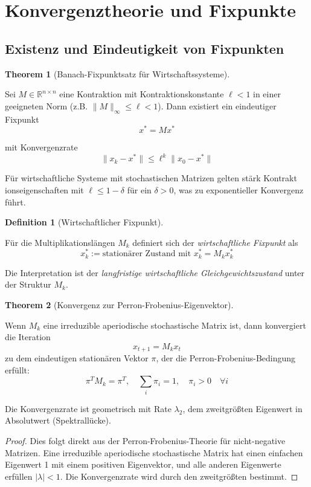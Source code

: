 \documentclass[a4paper,12pt]{article}
\theoremstyle{definition}
\newtheorem{definition}{Definition}
\newtheorem{theorem}{Theorem}
\begin{document}
\section{Konvergenztheorie und Fixpunkte}

\subsection{Existenz und Eindeutigkeit von Fixpunkten}

\begin{theorem}[Banach-Fixpunktsatz für Wirtschaftssysteme]
\label{thm:banach_wirtschaft}

Sei $M \in \mathbb{R}^{n \times n}$ eine Kontraktion mit Kontraktionskonstante $\ell < 1$ in einer geeigneten Norm (z.B. $\|M\|_\infty \leq \ell < 1$). Dann existiert ein eindeutiger Fixpunkt
\[
x^* = M x^*
\]

mit Konvergenzrate
\[
\|x_k - x^*\| \leq \ell^k \|x_0 - x^*\|
\]

Für wirtschaftliche Systeme mit stochastischen Matrizen gelten stärk Kontrakt ionseigenschaften mit $\ell \leq 1 - \delta$ für ein $\delta > 0$, was zu exponentieller Konvergenz führt.
\end{theorem}

\begin{definition}[Wirtschaftlicher Fixpunkt]
\label{def:fixpunkt_wirtschaft}

Für die Multiplikationslängen $M_k$ definiert sich der \emph{wirtschaftliche Fixpunkt} als
\[
x^*_k := \text{stationärer Zustand mit } x^*_k = M_k x^*_k
\]

Die Interpretation ist der \emph{langfristige wirtschaftliche Gleichgewichtszustand} unter der Struktur $M_k$.
\end{definition}

\begin{theorem}[Konvergenz zur Perron-Frobenius-Eigenvektor]
\label{thm:perron_frobenius_mlm}

Wenn $M_k$ eine irreduzible aperiodische stochastische Matrix ist, dann konvergiert die Iteration
\[
x_{t+1} = M_k x_t
\]
zu dem eindeutigen stationären Vektor $\pi$, der die Perron-Frobenius-Bedingung erfüllt:
\[
\pi^T M_k = \pi^T, \quad \sum_i \pi_i = 1, \quad \pi_i > 0 \quad \forall i
\]

Die Konvergenzrate ist geometrisch mit Rate $\lambda_2$, dem zweitgrößten Eigenwert in Absolutwert (Spektrallücke).
\end{theorem}

\begin{proof}

Dies folgt direkt aus der Perron-Frobenius-Theorie für nicht-negative Matrizen. Eine irreduzible aperiodische stochastische Matrix hat einen einfachen Eigenwert 1 mit einem positiven Eigenvektor, und alle anderen Eigenwerte erfüllen $|\lambda| < 1$. Die Konvergenzrate wird durch den zweitgrößten bestimmt.

\end{proof}
\end{document}
